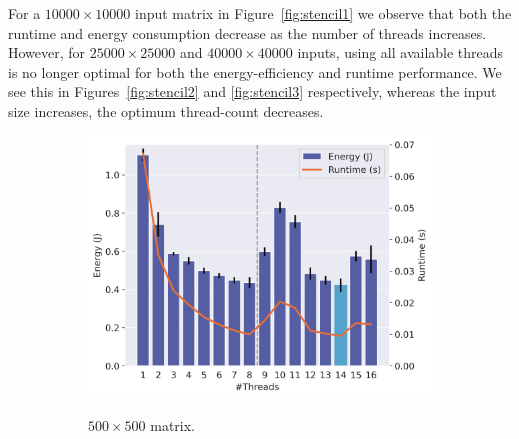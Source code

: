 For a $10000 \times 10000$ input matrix in Figure~\ref{fig:stencil1} we observe that both the
runtime and energy consumption decrease as the number of threads increases. However, for $25000
\times 25000$ and $40000 \times 40000$ inputs, using all available threads is no longer optimal for
both the energy-efficiency and runtime performance. We see this in Figures~\ref{fig:stencil2} and
\ref{fig:stencil3} respectively, whereas the input size increases, the optimum thread-count
decreases.

\begin{figure}[!ht]
    \centering
    \begin{subfigure}{0.33\linewidth}
        \includegraphics[width=\linewidth,alt={
            Chart showing energy consumption and runtime across different numbers of threads. The
            x-axis represents the number of threads from 1 to 16. The left y-axis shows bars
            indicating energy consumption in joules. The right y-axis shows an orange line
            indicating the runtime in seconds. Energy consumption peaks at one threads and gradually
            decreases from one to eight threads, after which it starts noticeably fluctuating.
            Reaching a minimum at 14 threads, with an energy consumption roughly equal to that of
            eight threads. Runtime follows a similar pattern, albeit being more pronounced.
        }]{images/matmul_500.png}
        \caption{$500 \times 500$ matrix.}
        \label{fig:matmul1}
    \end{subfigure}%
    \begin{subfigure}{0.33\linewidth}

\end{subfigure}
\end{figure}
